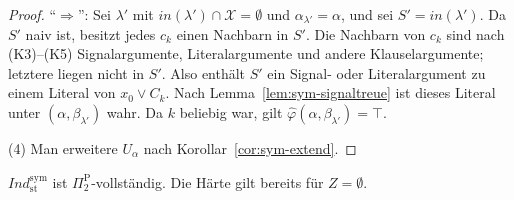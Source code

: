\begin{proof}
    \enquote{\(\Rightarrow\)}: Sei \(\lambda'\) mit
    \(\mathit{in}(\lambda')\cap\mathcal{X}=\emptyset\) und
    \(\alpha_{\lambda'}=\alpha\), und sei \(S'=\mathit{in}(\lambda')\). Da
    \(S'\) naiv ist, besitzt jedes \(c_k\) einen Nachbarn in \(S'\). Die
    Nachbarn von \(c_k\) sind nach (K3)--(K5) Signalargumente,
    Literalargumente und andere Klauselargumente; letztere liegen nicht in
    \(S'\). Also enthält \(S'\) ein Signal- oder Literalargument zu einem
    Literal von \(x_0\lor C_k\). Nach Lemma~\ref{lem:sym-signaltreue} ist
    dieses Literal unter \((\alpha,\beta_{\lambda'})\) wahr. Da \(k\) beliebig
    war, gilt \(\widehat{\varphi}(\alpha,\beta_{\lambda'})=\top\).

    (4) Man erweitere \(U_\alpha\) nach Korollar~\ref{cor:sym-extend}.
\end{proof}

\begin{Theorem}
    \label{th:sym-st-pi2p}
    \(\textit{Ind}^{\mathrm{sym}}_{\mathrm{st}}\) ist
    \(\Pi_2^\text{P}\)-vollständig. Die Härte gilt bereits für
    \(Z=\emptyset\).
\end{Theorem}


